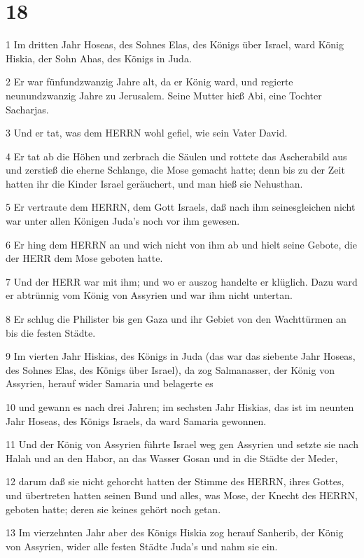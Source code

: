 \chapter{18}

\par 1 Im dritten Jahr Hoseas, des Sohnes Elas, des Königs über Israel, ward König Hiskia, der Sohn Ahas, des Königs in Juda.
\par 2 Er war fünfundzwanzig Jahre alt, da er König ward, und regierte neunundzwanzig Jahre zu Jerusalem. Seine Mutter hieß Abi, eine Tochter Sacharjas.
\par 3 Und er tat, was dem HERRN wohl gefiel, wie sein Vater David.
\par 4 Er tat ab die Höhen und zerbrach die Säulen und rottete das Ascherabild aus und zerstieß die eherne Schlange, die Mose gemacht hatte; denn bis zu der Zeit hatten ihr die Kinder Israel geräuchert, und man hieß sie Nehusthan.
\par 5 Er vertraute dem HERRN, dem Gott Israels, daß nach ihm seinesgleichen nicht war unter allen Königen Juda's noch vor ihm gewesen.
\par 6 Er hing dem HERRN an und wich nicht von ihm ab und hielt seine Gebote, die der HERR dem Mose geboten hatte.
\par 7 Und der HERR war mit ihm; und wo er auszog handelte er klüglich. Dazu ward er abtrünnig vom König von Assyrien und war ihm nicht untertan.
\par 8 Er schlug die Philister bis gen Gaza und ihr Gebiet von den Wachttürmen an bis die festen Städte.
\par 9 Im vierten Jahr Hiskias, des Königs in Juda (das war das siebente Jahr Hoseas, des Sohnes Elas, des Königs über Israel), da zog Salmanasser, der König von Assyrien, herauf wider Samaria und belagerte es
\par 10 und gewann es nach drei Jahren; im sechsten Jahr Hiskias, das ist im neunten Jahr Hoseas, des Königs Israels, da ward Samaria gewonnen.
\par 11 Und der König von Assyrien führte Israel weg gen Assyrien und setzte sie nach Halah und an den Habor, an das Wasser Gosan und in die Städte der Meder,
\par 12 darum daß sie nicht gehorcht hatten der Stimme des HERRN, ihres Gottes, und übertreten hatten seinen Bund und alles, was Mose, der Knecht des HERRN, geboten hatte; deren sie keines gehört noch getan.
\par 13 Im vierzehnten Jahr aber des Königs Hiskia zog herauf Sanherib, der König von Assyrien, wider alle festen Städte Juda's und nahm sie ein.
